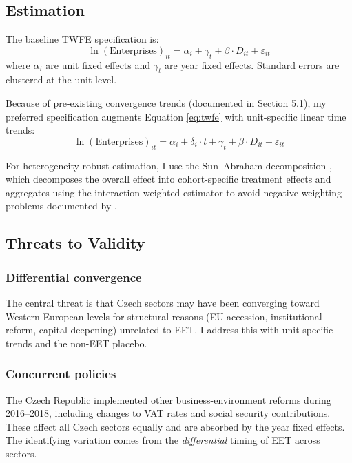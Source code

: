 \documentclass[12pt]{article}
\begin{document}
\subsection{Estimation}

The baseline TWFE specification is:
\begin{equation}
  \ln(\text{Enterprises})_{it} = \alpha_i + \gamma_t + \beta \cdot D_{it} + \varepsilon_{it}
  \label{eq:twfe}
\end{equation}
where $\alpha_i$ are unit fixed effects and $\gamma_t$ are year fixed effects. Standard errors are clustered at the unit level.

Because of pre-existing convergence trends (documented in Section 5.1), my preferred specification augments Equation \ref{eq:twfe} with unit-specific linear time trends:
\begin{equation}
  \ln(\text{Enterprises})_{it} = \alpha_i + \delta_i \cdot t + \gamma_t + \beta \cdot D_{it} + \varepsilon_{it}
  \label{eq:trends}
\end{equation}

For heterogeneity-robust estimation, I use the Sun--Abraham decomposition \citep{sun2021}, which decomposes the overall effect into cohort-specific treatment effects and aggregates using the interaction-weighted estimator to avoid negative weighting problems documented by \citet{goodman2021}.

\subsection{Threats to Validity}

\subsubsection*{Differential convergence} The central threat is that Czech sectors may have been converging toward Western European levels for structural reasons (EU accession, institutional reform, capital deepening) unrelated to EET. I address this with unit-specific trends and the non-EET placebo.

\subsubsection*{Concurrent policies} The Czech Republic implemented other business-environment reforms during 2016--2018, including changes to VAT rates and social security contributions. These affect all Czech sectors equally and are absorbed by the year fixed effects. The identifying variation comes from the \textit{differential} timing of EET across sectors.
\end{document}
